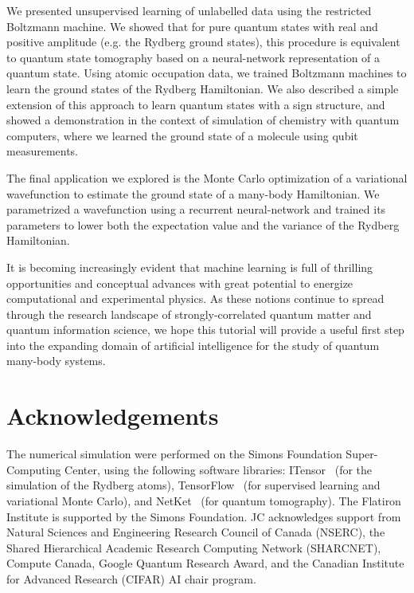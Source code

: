 \documentclass[twocolumn,english,reprint,superscriptaddress,longbibliography,pra]{revtex4-1}
\begin{document}
We presented unsupervised learning of unlabelled data using the restricted Boltzmann machine. We showed that for pure quantum states with real and positive amplitude (e.g. the Rydberg ground states), this procedure is equivalent to quantum state tomography based on a neural-network representation of a quantum state. Using atomic occupation data, we trained Boltzmann machines to learn the ground states of the Rydberg Hamiltonian. We also described a simple extension of this approach to learn quantum states with a sign structure, and showed a demonstration in the context of simulation of chemistry with quantum computers, where we learned the ground state of a molecule using qubit measurements.

The final application we explored is the Monte Carlo optimization of a variational wavefunction to estimate the ground state of a many-body Hamiltonian. We parametrized a wavefunction using a recurrent neural-network and trained its parameters to lower both the expectation value and the variance of the Rydberg Hamiltonian. 

It is becoming increasingly evident that machine learning is full of thrilling opportunities and conceptual advances with great potential to energize computational and experimental physics. As these notions continue to spread through the research landscape of strongly-correlated quantum matter and quantum information science, we hope this tutorial will provide a useful first step into the expanding domain of artificial intelligence for the study of quantum many-body systems.
   
\section*{Acknowledgements}
The numerical simulation were performed on the Simons Foundation Super-Computing Center, using the following software libraries: ITensor~\cite{itensor} (for the simulation of the Rydberg atoms), TensorFlow~\cite{tensorflow} (for supervised learning and variational Monte Carlo), and NetKet~\cite{netket} (for quantum tomography). The Flatiron Institute is supported by the Simons Foundation. JC acknowledges support from Natural Sciences and Engineering Research Council of Canada (NSERC), the Shared Hierarchical Academic Research Computing Network (SHARCNET), Compute Canada, Google Quantum Research Award, and the Canadian Institute for Advanced Research (CIFAR) AI chair program. 


\end{document}
